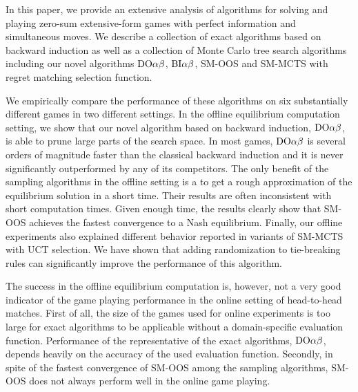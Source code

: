 
In this paper, we provide an extensive analysis of algorithms for solving and playing zero-sum extensive-form games with perfect information and simultaneous moves. We describe a collection of exact algorithms based on backward induction as well as a collection of Monte Carlo tree search algorithms including our novel algorithms $\textrm{DO}\alpha\beta$, $\textrm{BI}\alpha\beta$, SM-OOS and SM-MCTS with regret matching selection function. 

We empirically compare the performance of these algorithms on six substantially different games in two different settings. In the offline equilibrium computation setting, we show that our novel algorithm based on backward induction, $\textrm{DO}\alpha\beta$, is able to prune large parts of the search space. In most games, $\textrm{DO}\alpha\beta$ is several orders of magnitude faster than the classical backward induction and it is never significantly outperformed by any of its competitors. The only benefit of the sampling algorithms in the offline setting is a to get a rough approximation of the equilibrium solution in a short time. Their results are often inconsistent with short computation times. Given enough time, the results clearly show that SM-OOS achieves the fastest convergence to a Nash equilibrium. Finally, our offline experiments also explained different behavior reported in variants of SM-MCTS with UCT selection. We have shown that adding randomization to tie-breaking rules can significantly improve the performance of this algorithm.

The success in the offline equilibrium computation is, however, not a very good indicator of the game playing performance in the online setting of head-to-head matches. First of all, the size of the games used for online experiments is too large for exact algorithms to be applicable without a domain-specific evaluation function. Performance of the representative of the exact algorithms, $\textrm{DO}\alpha\beta$, depends heavily on the accuracy of the used evaluation function. Secondly, in spite of the fastest convergence of SM-OOS among the sampling algorithms, SM-OOS does not always perform well in the online game playing. 


